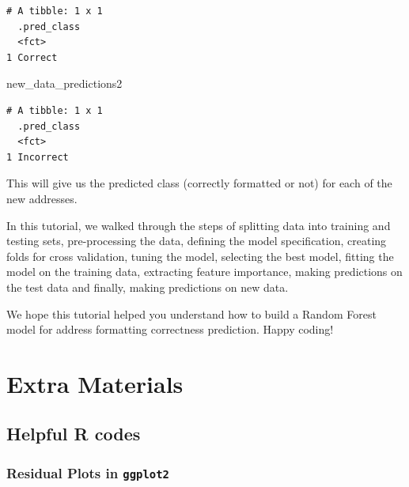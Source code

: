 \documentclass[
]{book}
\newenvironment{Shaded}{\begin{snugshade}}{\end{snugshade}}
\newcommand{\NormalTok}[1]{#1}
\begin{document}
\begin{verbatim}
# A tibble: 1 x 1
  .pred_class
  <fct>      
1 Correct    
\end{verbatim}

\begin{Shaded}
\begin{Highlighting}[]
\NormalTok{new\_data\_predictions2}
\end{Highlighting}
\end{Shaded}

\begin{verbatim}
# A tibble: 1 x 1
  .pred_class
  <fct>      
1 Incorrect  
\end{verbatim}

This will give us the predicted class (correctly formatted or not) for each of the new addresses.

In this tutorial, we walked through the steps of splitting data into training and testing sets, pre-processing the data, defining the model specification, creating folds for cross validation, tuning the model, selecting the best model, fitting the model on the training data, extracting feature importance, making predictions on the test data and finally, making predictions on new data.

We hope this tutorial helped you understand how to build a Random Forest model for address formatting correctness prediction. Happy coding!

\hypertarget{part-extra-materials}{%
\part*{Extra Materials}\label{part-extra-materials}}

\hypertarget{helpful-r-codes}{%
\chapter{Helpful R codes}\label{helpful-r-codes}}

\hypertarget{residual-plots-in-ggplot2}{%
\section{\texorpdfstring{Residual Plots in \texttt{ggplot2}}{Residual Plots in ggplot2}}\label{residual-plots-in-ggplot2}}
\end{document}
